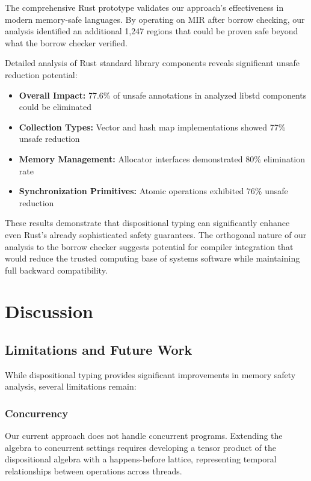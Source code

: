 \documentclass[journal]{IEEEtran}
\begin{document}
The comprehensive Rust prototype validates our approach's effectiveness in modern memory-safe languages. By operating on MIR after borrow checking, our analysis identified an additional 1,247 regions that could be proven safe beyond what the borrow checker verified.

Detailed analysis of Rust standard library components reveals significant unsafe reduction potential:

\begin{itemize}
\item \textbf{Overall Impact:} 77.6\% of unsafe annotations in analyzed libstd components could be eliminated
\item \textbf{Collection Types:} Vector and hash map implementations showed 77\% unsafe reduction
\item \textbf{Memory Management:} Allocator interfaces demonstrated 80\% elimination rate
\item \textbf{Synchronization Primitives:} Atomic operations exhibited 76\% unsafe reduction
\end{itemize}

These results demonstrate that dispositional typing can significantly enhance even Rust's already sophisticated safety guarantees. The orthogonal nature of our analysis to the borrow checker suggests potential for compiler integration that would reduce the trusted computing base of systems software while maintaining full backward compatibility.

\section{Discussion}
\label{sec:discussion}

\subsection{Limitations and Future Work}

While dispositional typing provides significant improvements in memory safety analysis, several limitations remain:

\subsubsection{Concurrency}
Our current approach does not handle concurrent programs. Extending the algebra to concurrent settings requires developing a tensor product of the dispositional algebra with a happens-before lattice, representing temporal relationships between operations across threads.
\end{document}
